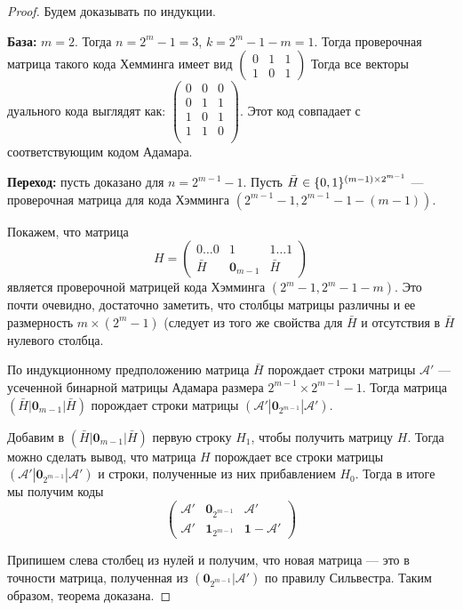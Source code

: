 \begin{proof}
Будем доказывать по индукции.

{\bfseries База:} $m=2$. Тогда $n = 2^m - 1 = 3$, $k=2^m-1-m = 1$.
Тогда проверочная матрица такого кода Хемминга имеет вид 
$\begin{pmatrix} 0 &1 &1 \\ 1 & 0 & 1 \end{pmatrix}$
Тогда все векторы дуального кода выглядят как:
$\begin{pmatrix} 0 & 0 & 0 \\
                 0 & 1 & 1 \\
                 1 & 0 & 1 \\
                 1 & 1 & 0 \\
 \end{pmatrix}$.
Этот код совпадает с соответствующим кодом Адамара.

{\bfseries Переход:} пусть доказано для $n = 2^{m-1} - 1$.
Пусть $\bar{H} \in \{0,1\}^{(m-1) \times 2^{m-1}}$ --- проверочная матрица для кода Хэмминга
$(2^{m-1} - 1, 2^{m-1} - 1 - (m-1))$.

Покажем, что матрица 
$$ H = \begin{pmatrix}
            0 \ldots 0 & 1 & 1 \ldots 1 \\
               \bar{H} & \mathbf{0}_{m-1} & \bar{H}
        \end{pmatrix}$$
является проверочной матрицей кода Хэмминга $(2^m-1, 2^m - 1 - m)$.
Это почти очевидно, достаточно заметить, что столбцы матрицы
различны и ее размерность $m \times (2^m-1)$ (следует из
того же свойства для $\bar{H}$ и отсутствия в $\bar{H}$ нулевого
столбца. 

По индукционному предположению матрица $\bar{H}$ порождает строки
матрицы $\mathcal{A}'$ --- усеченной бинарной матрицы Адамара размера
 $2^{m-1} \times 2^{m-1} - 1$. Тогда матрица 
 $(\bar{H} | \mathbf{0}_{m-1} | \bar{H})$ порождает строки
 матрицы $(\mathcal{A}' | \mathbf{0}_{2^{m-1}} | \mathcal{A}')$.
 
Добавим в $(\bar{H} | \mathbf{0}_{m-1} | \bar{H})$ первую строку $H_1$,
чтобы получить матрицу $H$. Тогда можно сделать вывод, что
матрица $H$ порождает все строки матрицы 
$(\mathcal{A}' | \mathbf{0}_{2^{m-1}} | \mathcal{A}')$ и
строки, полученные из них прибавлением $H_0$. Тогда в
итоге мы получим коды
$$\begin{pmatrix}
    \mathcal{A}' & \mathbf{0}_{2^{m-1}} & \mathcal{A}' \\
    \mathcal{A}' & \mathbf{1}_{2^{m-1}} & \mathbf{1} - \mathcal{A}'
   \end{pmatrix}$$

Припишем слева столбец из нулей и получим, что новая матрица
--- это в точности матрица, полученная из 
$(\mathbf{0}_{2^{m-1}} | \mathcal{A}')$ по правилу Сильвестра.
Таким образом, теорема доказана.

\end{proof}

